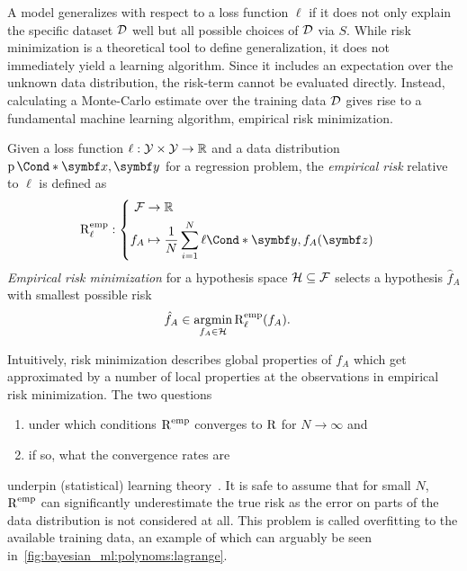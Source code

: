 A model generalizes with respect to a loss function $\ell$ if it does not only explain the specific dataset $\mathcal{D}$ well but all possible choices of $\mathcal{D}$ via $S$.
While risk minimization is a theoretical tool to define generalization, it does not immediately yield a learning algorithm.
Since it includes an expectation over the unknown data distribution, the risk-term cannot be evaluated directly.
Instead, calculating a Monte-Carlo estimate over the training data $\mathcal{D}$ gives rise to a fundamental machine learning algorithm, empirical risk minimization.

\begin{definition}
    \label{def:empirical_risk_minimization}
    Given a loss function $\ell: \mathcal{Y} \times \mathcal{Y} \to \mathbb{R}$ and a data distribution $\Prob*{\mat{x}, \mat{y}}$ for a regression problem, the \emph{empirical risk} relative to $\ell$ is defined as
    \begin{align}
        \risk^{\text{emp}}_\ell & : \left\{
        \begin{aligned}
            \Fc & \to \Rb                                                             \\
            f_A & \mapsto \frac{1}{N} \sum_{i=1}^N \Fun*{\ell}{\mat{y}, f_A(\mat{z})}
        \end{aligned}
        \right.
    \end{align}
    \emph{Empirical risk minimization} for a hypothesis space $\mathcal{H} \subseteq \mathcal{F}$ selects a hypothesis $\hat{f}_A$ with smallest possible risk
    \begin{align}
        \hat{f}_A & \in \operatorname*{argmin}_{f_A \in \mathcal{H}} \operatorname{R}^{\text{emp}}_\ell(f_A).
    \end{align}
\end{definition}

Intuitively, risk minimization describes global properties of $f_A$ which get approximated by a number of local properties at the observations in empirical risk minimization.
The two questions
\begin{enumerate}
    \item under which conditions $\operatorname{R}^{\text{emp}}$ converges to $\operatorname{R}$ for $N \to \infty$ and
    \item if so, what the convergence rates are
\end{enumerate}
underpin (statistical) learning theory~\parencite{vapnik_principles_1992}.
It is safe to assume that for small $N$, $\operatorname{R}^{\text{emp}}$ can significantly underestimate the true risk as the error on parts of the data distribution is not considered at all.
This problem is called overfitting to the available training data, an example of which can arguably be seen in~\cref{fig:bayesian_ml:polynoms:lagrange}.

